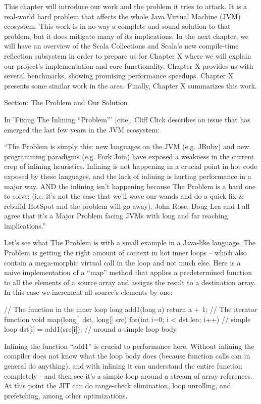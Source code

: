 This chapter will introduce our work and the problem it tries to attack. It is a
real-world hard problem that affects the whole Java Virtual Machine (JVM)
ecosystem. This work is in no way a complete and sound solution to that
problem, but it does mitigate many of its implications. In the next chapter, we
will have an overview of the Scala Collections and Scala's new
compile-time reflection subsystem in order to prepare us for Chapter X
where we will explain our project's implementation and core functionality.
Chapter X provides us with several benchmarks, showing promising performance
speedups. Chapter X presents some similar work in the area. Finally, Chapter X
summarizes this work.

Section: The Problem and Our Solution

In 'Fixing The Inlining ``Problem''' [cite], Cliff Click describes an issue
that has emerged the last few years in the JVM ecosystem:

``The Problem is simply this: new languages on the JVM (e.g. JRuby) and new
programming paradigms (e.g. Fork Join) have exposed a weakness in the current
crop of inlining heuristics.  Inlining is not happening in a crucial point in
hot code exposed by these languages, and the lack of inlining is hurting
performance in a major way.  AND the inlining isn’t happening because The
Problem is a hard one to solve; (i.e. it’s not the case that we’ll wave our
wands and do a quick fix & rebuild HotSpot and the problem will go away).   John
Rose, Doug Lea and I all agree that it's a Major Problem facing JVMs with long
and far reaching implications.''

Let's see what The Problem is with a small example in a Java-like language. The
Problem is getting the right amount of context in hot inner loops – which also
contain a mega-morphic virtual call in the loop and not much else.  Here is a
naive implementation of a ``map'' method that applies a predetermined
function to all the elements of a source array and assigns the result to a
destination array. In this case we increment all source's elements by one:

// The function in the inner loop
long add1(long a) {return a + 1;}
// The iterator function
void map(long[] dst, long[] src) {
  for(int i=0; i < dst.len; i++) // simple loop
    dst[i] = add1(src[i]); // around a simple loop body
}

Inlining the function ``add1'' is crucial to performance here.  Without
inlining the compiler does not know what the loop body does (because function
calls can in general do anything), and with inlining it can understand the
entire function completely - and then see it’s a simple loop around a stream of
array references.  At this point the JIT can do range-check elimination, loop
unrolling, and prefetching, among other optimizations.

